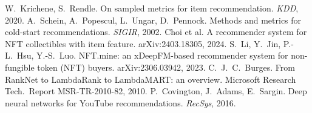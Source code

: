  W.~Krichene, S.~Rendle. On sampled metrics for item recommendation. \emph{KDD}, 2020.
 A.~Schein, A.~Popescul, L.~Ungar, D.~Pennock. Methods and metrics for cold-start recommendations. \emph{SIGIR}, 2002.
 Choi et al. A recommender system for NFT collectibles with item feature. arXiv:2403.18305, 2024.
 S.~Li, Y.~Jin, P.-L.~Hsu, Y.-S.~Luo. NFT.mine: an xDeepFM-based recommender system for non-fungible token (NFT) buyers. arXiv:2306.03942, 2023.
 C.~J.~C.~Burges. From RankNet to LambdaRank to LambdaMART: an overview. Microsoft Research Tech.\ Report MSR-TR-2010-82, 2010.
 P.~Covington, J.~Adams, E.~Sargin. Deep neural networks for YouTube recommendations. \emph{RecSys}, 2016.
